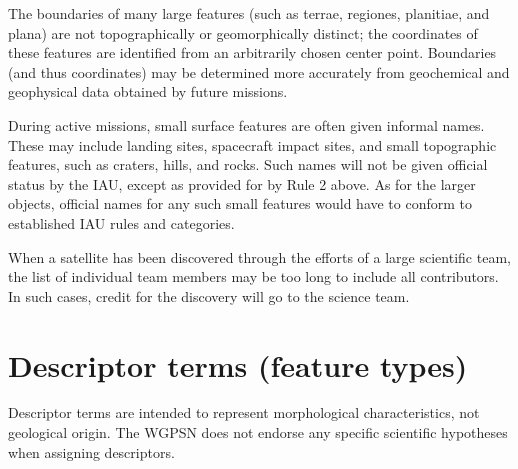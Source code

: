 The boundaries of many large features (such as terrae, regiones, planitiae, and plana) are not topographically or geomorphically distinct; the coordinates of these features are identified from an arbitrarily chosen center point. Boundaries (and thus coordinates) may be determined more accurately from geochemical and geophysical data obtained by future missions.

During active missions, small surface features are often given informal names. These may include landing sites, spacecraft impact sites, and small topographic features, such as craters, hills, and rocks. Such names will not be given official status by the IAU, except as provided for by Rule 2 above. As for the larger objects, official names for any such small features would have to conform to established IAU rules and categories.

When a satellite has been discovered through the efforts of a large scientific team, the list of individual team members may be too long to include all contributors. In such cases, credit for the discovery will go to the science team.

\newpage
\section{Descriptor terms (feature types)}
\label{sec:Nomenclature:DescriptorTerms}
Descriptor terms are intended to represent morphological characteristics, not geological origin. The WGPSN does not endorse any specific scientific hypotheses when assigning descriptors.

